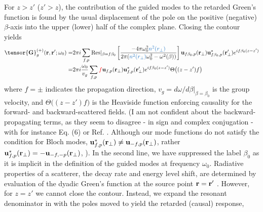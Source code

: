 \documentclass[preprint,aps,pra,onecolumn]{revtex4-1} %
\newcommand{\change}[1]{{\color{RoyalBlue} #1}}
\newcommand{\comment}[1]{{\color{Maroon} #1}}
\newcommand{\error}[1]{{\color{red} #1}}
\begin{document}
For $z>z'$ ($z'>z$), the contribution of the guided modes to the retarded Green's function is found by the 
usual displacement of the pole on the positive (negative) $\beta$-axis into the upper (lower) half of 
the complex plane. Closing the contour yields
	\begin{align} 
		\tensor{\mathbf{G}}^{(+)}_g(\br,\br'; \omega_0) = &2\pi i \sum_{f,p}  {\rm Res}\vert_{\beta =f\beta_0} 
\left[\frac{-4\pi \omega_0^2 \change{n^2(r_\perp)}}{2\pi (\change{n^2(r_\perp)} \omega_0^2-\omega^2(\beta))}\right]  \mathbf{u}_{f\beta_0, p} 
(\br_\perp)\mathbf{u}^*_{f\beta_0, p} (\br_{\perp}^\prime)e^{if \beta_0 (z-z')} \nonumber \\
= & 2\pi i \frac{\omega_0}{v_g } \sum_{f,p} \error{f}  \mathbf{u}_{f, p} (\br_\perp)\mathbf{u}^*_{f , p} 
(\br_{\perp}^\prime) e^{i f \beta_0(z-z')} \Theta \big( (z-z')f \big) \label{Eq::GreensGuided}
	\end{align}
where $f=\pm$ indicates the propagation direction, $v_g= d\omega/d\beta \vert_{\beta=\beta_0}$ is the group velocity, and $\Theta \big( (z-z')f \big)$ is the Heaviside function enforcing causality for the forward- and backward-scattered fields. \comment{ (I am not confident about the backward-propagating terms, as they seem to disagree - in sign and complex conjugation - with for instance Eq. (6) or Ref. \cite{manga_rao_single_2007}.  Although our mode functions do not satisfy the condition for Bloch modes, $\mathbf{u}_{f,p}^*(\mathbf{r}_\perp) \neq \mathbf{u}_{-f,p}(\mathbf{r}_\perp)$, rather $\mathbf{u}_{f,p}^*(\mathbf{r}_\perp) = -\mathbf{u}_{-f,-p}(\mathbf{r}_\perp)$,  )}.  In the second line, we have suppressed the label $\beta_0$ as it is implicit in the definition of the guided modes at frequency $\omega_0$. Radiative properties of a scatterer, the decay rate and energy level shift, are determined by evaluation of the dyadic Green's function at the source point $\mathbf{r} = \mathbf{r}'$ \cite{fussell_decay_2005}.  However, for $z=z'$ we cannot close the contour. Instead, we expand the resonant denominator in  with the poles moved to yield the retarded (causal) response,
\end{document}

